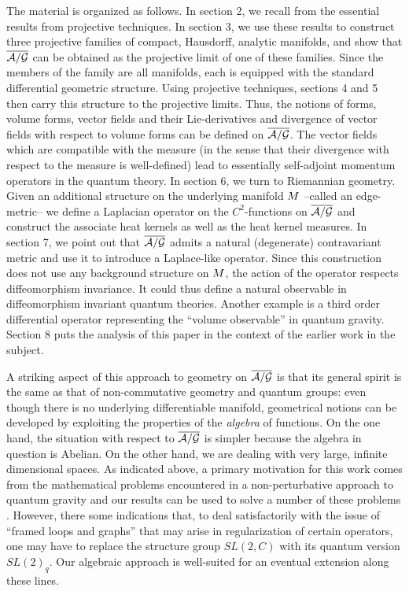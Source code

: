 The material is organized as follows. In section 2, we recall from
\cite{AL2} the essential results from projective techniques. In section
3, we use these results to construct three projective families of
compact, Hausdorff, analytic manifolds, and show that $\agb$ can be
obtained as the projective limit of one of these families. Since the
members of the family are all manifolds, each is equipped with the
standard differential geometric structure. Using projective
techniques, sections 4 and 5 then carry this structure to the
projective limits. Thus, the notions of forms, volume forms, vector
fields and their Lie-derivatives and divergence of vector fields with
respect to volume forms can be defined on $\agb$. The vector fields
which are compatible with the measure (in the sense that their
divergence with respect to the measure is well-defined) lead to
essentially self-adjoint momentum operators in the quantum theory. In
section 6, we turn to Riemannian geometry. Given an additional
structure on the underlying manifold $\S$ --called an edge-metric-- we
define a Laplacian operator on the $C^2$-functions on $\agb$ and
construct the associate heat kernels as well as the heat kernel
measures. In section 7, we point out that $\agb$ admits a natural
(degenerate) contravariant metric and use it to introduce a
Laplace-like operator. Since this construction does not use any
background structure on $\S$, the action of the operator respects
diffeomorphism invariance. It could thus define a natural observable
in diffeomorphism invariant quantum theories. Another example is a
third order differential operator representing the ``volume
observable'' in quantum gravity.  Section 8 puts the analysis of this
paper in the context of the earlier work in the subject.

A striking aspect of this approach to geometry on $\agb$ is that its
general spirit is the same as that of non-commutative geometry and
quantum groups: even though there is no underlying differentiable
manifold, geometrical notions can be developed by exploiting the
properties of the {\it algebra} of functions. On the one hand, the
situation with respect to $\agb$ is simpler because the algebra in
question is Abelian. On the other hand, we are dealing with very
large, infinite dimensional spaces. As indicated above, a primary
motivation for this work comes from the mathematical problems
encountered in a non-perturbative approach to quantum gravity
\cite{AA3} and our results can be used to solve a number of these
problems \cite{ALMMT2, AA2}. However, there some indications that, to
deal satisfactorily with the issue of ``framed loops and graphs'' that
may arise in regularization of certain operators, one may have to
replace the structure group $SL(2, C)$ with its quantum version
$SL(2)_q$. Our algebraic approach is well-suited for an eventual
extension along these lines.


